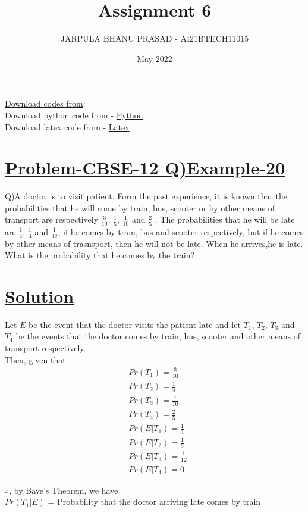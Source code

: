 \documentclass[journal,12pt,twocolumn]{IEEEtran}
\title{Assignment 6}
\author{JARPULA BHANU PRASAD - AI21BTECH11015}
\date{May 2022}
\begin{document}
\maketitle
\noindent \Large\underline{Download codes from}:\\
\noindent\large Download python code from - \href{https://github.com/jarpula-Bhanu/Assignment-6/blob/main/code/verify.py}{Python}\\ Download latex code from - \href{https://github.com/jarpula-Bhanu/Assignment-6/blob/main/Assignment\%206.tex}{Latex}

\section{\large\underline{Problem-CBSE-12 Q)Example-20}}
\noindent\large Q)A doctor is to visit patient. Form the past experience, it is known that the probabilities that he will come by train, bus, scooter or by other means of transport are respectively $\frac{3}{10}$, $\frac{1}{5}$, $\frac{1}{10}$ and $\frac{2}{5}$ . The probabilities that he will be late are $\frac{1}{4}$, $\frac{1}{3}$ and $\frac{1}{12}$, if he comes by train, bus and scooter respectively, but if he comes by other means of trasnsport, then he will not be late. When he arrives,he is late. What is the probability that he comes by the train?

\section{\large\underline{Solution}}
\noindent Let $E$ be the event that the doctor visits the patient late and let $T_1$, $T_2$, $T_3$ and $T_4$ be the events that the doctor comes by train, bus, scooter and other means of transport respectively. \\
Then, given that
\begin{align}
& Pr(T_1) = \frac{3}{10} \\
& Pr(T_2) = \frac{1}{5} \\
& Pr(T_3) = \frac{1}{10} \\
& Pr(T_4) = \frac{2}{5} \\
& Pr(E|T_1) = \frac{1}{4} \\
& Pr(E|T_2) = \frac{1}{3} \\
& Pr(E|T_3) = \frac{1}{12} \\
& Pr(E|T_4) = 0 
\end{align}

$\therefore$, by Baye's Theorem, we have \\
$Pr(T_1|E)$ = Probability that the doctor arriving late comes by train 
\end{document}
